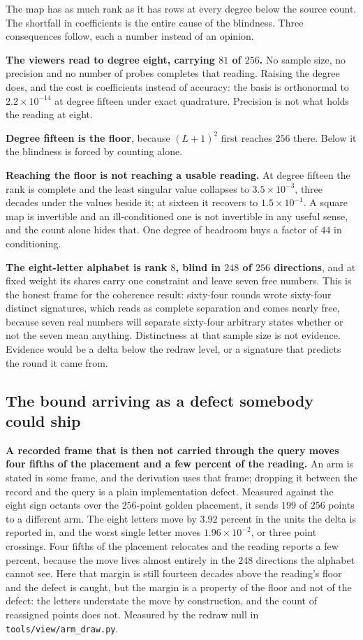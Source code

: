 The map has as much rank as it has rows at every degree below the source count. The shortfall in coefficients is the entire cause of the blindness. Three consequences follow, each a number instead of an opinion.

\textbf{The viewers read to degree eight, carrying \(81\) of \(256\).} No sample size, no precision and no number of probes completes that reading. Raising the degree does, and the cost is coefficients instead of accuracy: the basis is orthonormal to \(2.2 \times 10^{-14}\) at degree fifteen under exact quadrature. Precision is not what holds the reading at eight.

\textbf{Degree fifteen is the floor}, because \((L+1)^2\) first reaches \(256\) there. Below it the blindness is forced by counting alone.

\textbf{Reaching the floor is not reaching a usable reading.} At degree fifteen the rank is complete and the least singular value collapses to \(3.5 \times 10^{-3}\), three decades under the values beside it; at sixteen it recovers to \(1.5 \times 10^{-1}\). A square map is invertible and an ill-conditioned one is not invertible in any useful sense, and the count alone hides that. One degree of headroom buys a factor of \(44\) in conditioning.

\textbf{The eight-letter alphabet is rank \(8\), blind in \(248\) of \(256\) directions}, and at fixed weight its shares carry one constraint and leave seven free numbers. This is the honest frame for the coherence result: sixty-four rounds wrote sixty-four distinct signatures, which reads as complete separation and comes nearly free, because seven real numbers will separate sixty-four arbitrary states whether or not the seven mean anything. Distinctness at that sample size is not evidence. Evidence would be a delta below the redraw level, or a signature that predicts the round it came from.

\subsection{The bound arriving as a defect somebody could ship}

\textbf{A recorded frame that is then not carried through the query moves four fifths of the placement and a few percent of the reading.} An arm is stated in some frame, and the derivation uses that frame; dropping it between the record and the query is a plain implementation defect. Measured against the eight sign octants over the \(256\)-point golden placement, it sends \(199\) of \(256\) points to a different arm. The eight letters move by \(3.92\) percent in the units the delta is reported in, and the worst single letter moves \(1.96 \times 10^{-2}\), or three point crossings. Four fifths of the placement relocates and the reading reports a few percent, because the move lives almost entirely in the \(248\) directions the alphabet cannot see. Here that margin is still fourteen decades above the reading's floor and the defect is caught, but the margin is a property of the floor and not of the defect: the letters understate the move by construction, and the count of reassigned points does not. Measured by the redraw null in \texttt{tools/\allowbreak{}view/\allowbreak{}arm\_draw.py}.

